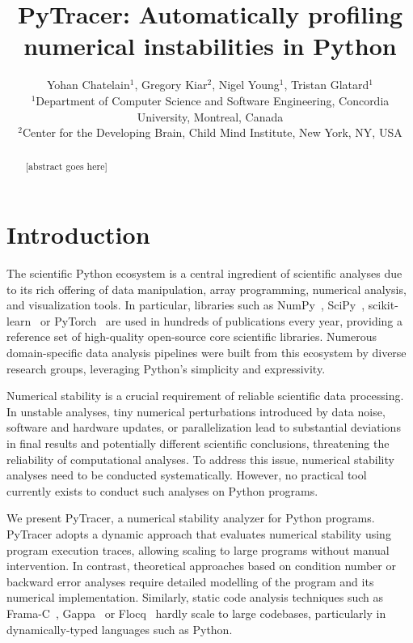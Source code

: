 \documentclass[11pt]{article}
\begin{document}
\title{PyTracer: Automatically profiling numerical instabilities in Python}
\author{Yohan Chatelain$^1$, Gregory Kiar$^2$, Nigel Young$^1$, Tristan Glatard$^1$\\
$^1$Department of Computer Science and Software Engineering, Concordia University, Montreal, Canada\\
$^2$Center for the Developing Brain, Child Mind Institute, New York, NY, USA}
\date{}
\maketitle

\begin{abstract}
[abstract goes here]
\end{abstract}

\section{Introduction}

The scientific Python ecosystem is a central ingredient of scientific
analyses due to its rich offering of data manipulation, array programming,
numerical analysis, and visualization tools. In particular, libraries such
as NumPy~\cite{harris2020array}, SciPy~\cite{virtanen2020scipy}, scikit-learn~\cite{pedregosa2011scikit} or PyTorch~\cite{paszke2019pytorch} are used in hundreds of publications every year, providing a reference set of high-quality open-source core scientific libraries. Numerous domain-specific data analysis pipelines were built from this ecosystem by diverse research groups, leveraging Python's simplicity and expressivity. 

Numerical stability is a crucial requirement of reliable scientific data
processing. In unstable analyses, tiny numerical perturbations introduced
by data noise, software and hardware updates, or parallelization lead to
substantial deviations in final results and potentially different scientific conclusions, threatening the reliability of computational analyses. To address this issue, numerical stability analyses need to be conducted systematically. However, no practical tool currently exists to conduct such analyses on Python programs.

We present PyTracer, a numerical stability analyzer for Python programs.
PyTracer adopts a dynamic approach that evaluates numerical stability using program execution traces, allowing scaling to large programs without manual intervention. In contrast, theoretical approaches based on condition number or backward error analyses require detailed modelling of the program and its numerical implementation. Similarly, static code analysis techniques such as Frama-C~\cite{cuoq2012frama}, Gappa~\cite{de2010certifying} or Flocq~\cite{boldo2011flocq} hardly scale to large codebases, particularly in dynamically-typed languages such as Python.
\end{document}
